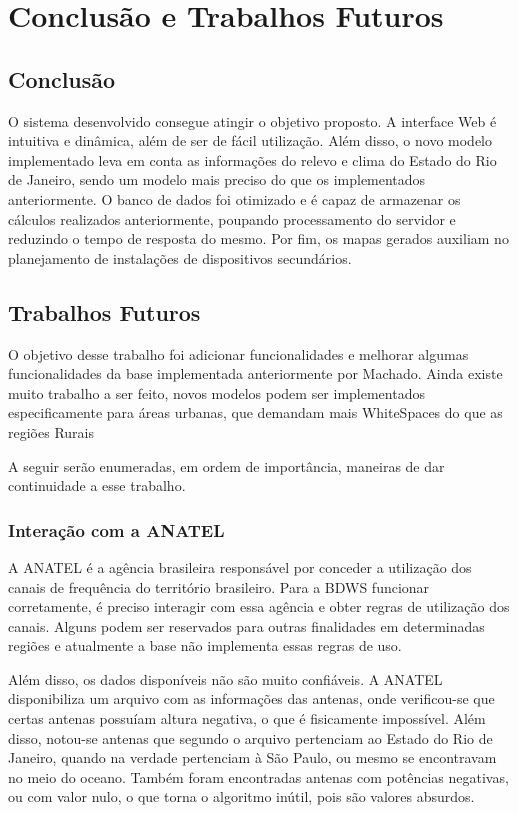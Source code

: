\chapter{Conclusão e Trabalhos Futuros}

\section{Conclusão}

O sistema desenvolvido consegue atingir o objetivo proposto. A interface Web é intuitiva e dinâmica, além de ser de fácil utilização. Além disso, o novo modelo implementado leva em conta as informações do relevo e clima do Estado do Rio de Janeiro, sendo um modelo mais preciso do que os implementados anteriormente. O banco de dados foi otimizado e é capaz de armazenar os cálculos realizados anteriormente, poupando processamento do servidor e reduzindo o tempo de resposta do mesmo. Por fim, os mapas gerados auxiliam no planejamento de instalações de dispositivos secundários.

\section{Trabalhos Futuros}

O objetivo desse trabalho foi adicionar funcionalidades e melhorar algumas funcionalidades da base implementada anteriormente por Machado. Ainda existe muito trabalho a ser feito, novos modelos podem ser implementados especificamente para áreas urbanas, que demandam mais WhiteSpaces do que as regiões Rurais

A seguir serão enumeradas, em ordem de importância, maneiras de dar continuidade a esse trabalho.

\subsection{Interação com a ANATEL}

A ANATEL é a agência brasileira responsável por conceder a utilização dos canais de frequência do território brasileiro. Para a BDWS funcionar corretamente, é preciso interagir com essa agência e obter regras de utilização dos canais. Alguns podem ser reservados para outras finalidades em determinadas regiões e atualmente a base não implementa essas regras de uso.

Além disso, os dados disponíveis não são muito confiáveis. A ANATEL disponibiliza um arquivo com as informações das antenas, onde verificou-se que certas antenas possuíam altura negativa, o que é fisicamente impossível. Além disso, notou-se antenas que segundo o arquivo pertenciam ao Estado do Rio de Janeiro, quando na verdade pertenciam à São Paulo, ou mesmo se encontravam no meio do oceano. Também foram encontradas antenas com potências negativas, ou com valor nulo, o que torna o algoritmo inútil, pois são valores absurdos.


